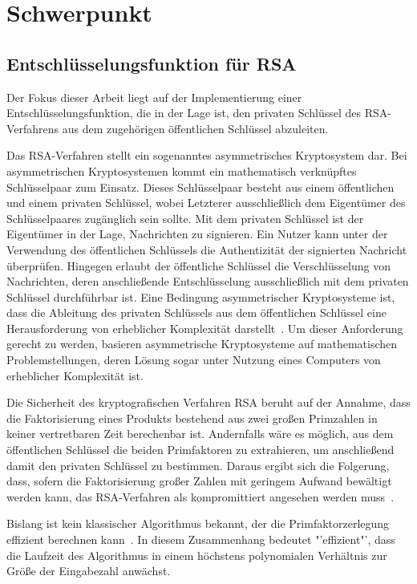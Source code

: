 \section{Schwerpunkt}
\subsection{Entschlüsselungsfunktion für RSA} 
Der Fokus dieser Arbeit liegt auf der Implementierung einer Entschlüsselungsfunktion, die in der Lage ist, 
den privaten Schlüssel des RSA-Verfahrens aus dem zugehörigen öffentlichen Schlüssel abzuleiten.

Das RSA-Verfahren stellt ein sogenanntes asymmetrisches Kryptosystem dar.
Bei asymmetrischen Kryptosystemen kommt ein mathematisch verknüpftes Schlüsselpaar zum Einsatz. 
Dieses Schlüsselpaar besteht aus einem öffentlichen und einem privaten Schlüssel, 
wobei Letzterer ausschließlich dem Eigentümer des Schlüsselpaares zugänglich sein sollte.
Mit dem privaten Schlüssel ist der Eigentümer in der Lage, Nachrichten zu signieren. 
Ein Nutzer kann unter der Verwendung des öffentlichen Schlüssels die Authentizität der signierten Nachricht überprüfen. 
Hingegen erlaubt der öffentliche Schlüssel die Verschlüsselung von Nachrichten, 
deren anschließende Entschlüsselung ausschließlich mit dem privaten Schlüssel durchführbar ist.
Eine Bedingung asymmetrischer Kryptosysteme ist, 
dass die Ableitung des privaten Schlüssels aus dem öffentlichen Schlüssel eine Herausforderung von erheblicher Komplexität darstellt~\cite{1055638}. 
Um dieser Anforderung gerecht zu werden, basieren asymmetrische Kryptosysteme auf mathematischen Problemstellungen, 
deren Lösung sogar unter Nutzung eines Computers von erheblicher Komplexität ist.

Die Sicherheit des kryptografischen Verfahren RSA beruht auf der Annahme,
dass die Faktorisierung eines Produkts bestehend aus zwei großen Primzahlen in keiner vertretbaren Zeit berechenbar ist.
Andernfalls wäre es möglich, aus dem öffentlichen Schlüssel die beiden Primfaktoren zu extrahieren, 
um anschließend damit den privaten Schlüssel zu bestimmen.
Daraus ergibt sich die Folgerung, dass, sofern die Faktorisierung großer Zahlen mit geringem Aufwand bewältigt werden kann, 
das RSA-Verfahren als kompromittiert angesehen werden muss~\cite{Cormen2009}.

Bislang ist kein klassischer Algorithmus bekannt, der die Primfaktorzerlegung effizient berechnen kann~\cite{Hoever2022Krypto}.
In diesem Zusammenhang bedeutet "'effizient"', dass die Laufzeit des Algorithmus in einem höchstens polynomialen Verhältnis zur Größe der Eingabezahl anwächst.

